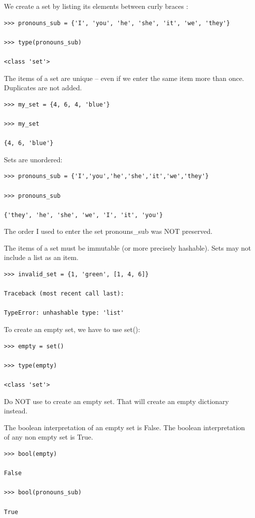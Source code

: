 \documentclass{article}
\begin{document}
We create a set by listing its elements between curly braces {}:

\begin{lstlisting}
>>> pronouns_sub = {'I', 'you', 'he', 'she', 'it', 'we', 'they'}

>>> type(pronouns_sub)

<class 'set'>
\end{lstlisting}

The items of a set are unique – even if we enter the same item more than once.  Duplicates are not added.

\begin{lstlisting}
>>> my_set = {4, 6, 4, 'blue'}

>>> my_set 

{4, 6, 'blue'}
\end{lstlisting}

Sets are unordered:

\begin{lstlisting}
>>> pronouns_sub = {'I','you','he','she','it','we','they'}

>>> pronouns_sub 

{'they', 'he', 'she', 'we', 'I', 'it', 'you'}
\end{lstlisting}

The order I used to enter the set pronouns{\_}sub was NOT preserved.

The items of a set must be immutable (or more precisely hashable).  Sets may not include a list as an item.

\begin{lstlisting}
>>> invalid_set = {1, 'green', [1, 4, 6]}

Traceback (most recent call last):

TypeError: unhashable type: 'list'
\end{lstlisting}

To create an empty set, we have to use set():

\begin{lstlisting}
>>> empty = set()

>>> type(empty)

<class 'set'> 
\end{lstlisting}

Do NOT use {} to create an empty set.  That will create an empty dictionary instead.

The boolean interpretation of an empty set is False.  The boolean interpretation of any non empty set is True.

\begin{lstlisting}
>>> bool(empty) 

False

>>> bool(pronouns_sub)

True
\end{lstlisting}
\end{document}
